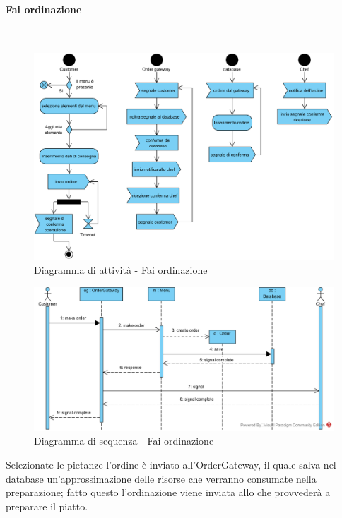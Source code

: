 \begin{samepage}
\paragraph{Fai ordinazione}\mbox{}\\
\begin{figure}[H]
	\centering
	\includegraphics[width=14cm]{diagrammi_img/attivita/customer_ordinazione.png}
	\caption{Diagramma di attività - Fai ordinazione}
\end{figure}
\end{samepage}
\begin{figure}[H]
	\centering
	\includegraphics[width=14cm]{../../documenti/SpecificaTecnica/diagrammi_img/sequenza/cliente_fai_ordinazione.png}
	\caption{Diagramma di sequenza - Fai ordinazione}
\end{figure}
Selezionate le pietanze l'ordine è inviato all'Order\-Gateway, il quale salva nel database un'approssimazione delle risorse che verranno consumate nella preparazione; fatto questo l'ordinazione viene inviata allo \Chef{} che provvederà a preparare il piatto.

